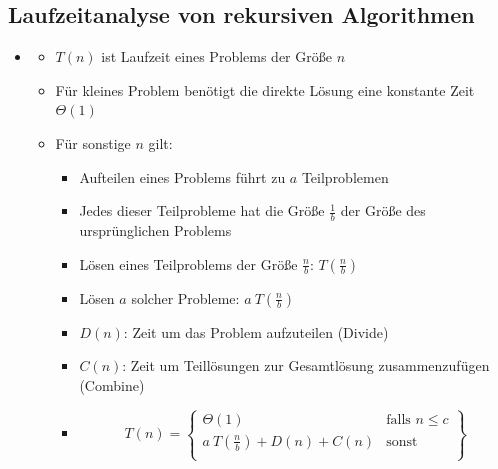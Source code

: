 \documentclass[
    12pt,
    a4paper,
    ngerman,
    color=3b,%
    marginpar=false,
    colorback=false,
    leqno,
]{tudaexercise}
\begin{document}
\subsection{Laufzeitanalyse von rekursiven Algorithmen}\label{Laufzeit rekursive Algorithmen}
\begin{itemize}
    \item {}
          \begin{itemize}
              \item $T(n)$ ist Laufzeit eines Problems der Größe $n$
              \item Für kleines Problem benötigt die direkte Lösung eine konstante Zeit $\Theta(1)$
              \item Für sonstige $n$ gilt:
                    \begin{itemize}
                        \item Aufteilen eines Problems führt zu $a$ Teilproblemen
                        \item Jedes dieser Teilprobleme hat die Größe $\frac{1}{b}$ der Größe des ursprünglichen Problems
                        \item Lösen eines Teilproblems der Größe $\frac{n}{b}$: $T(\frac{n}{b})$
                        \item Lösen $a$ solcher Probleme: $a~T(\frac{n}{b})$
                        \item $D(n)$: Zeit um das Problem aufzuteilen (Divide)
                        \item $C(n)$: Zeit um Teillösungen zur Gesamtlösung zusammenzufügen (Combine)
                        \item[] \[
                                  T(n) = \left.
                                  \begin{cases}
                                      \Theta(1)                      & \text{falls } n \leq c \\
                                      a~T(\frac{n}{b}) + D(n) + C(n) & \text{sonst}           \\
                                  \end{cases}
                                  \right \}
                              \]
                    \end{itemize}
          \end{itemize}


\end{itemize}
\end{document}
